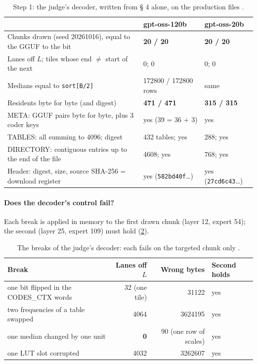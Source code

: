 \begin{table}[ht]
\centering\small
\caption[Step 1: a third decoder from § 4 alone]{Step 1: the judge's decoder, written from § 4 alone, on the production files \mes.}
\label{t2e-tab:geste1}
\begin{tabularx}{\linewidth}{@{}>{\raggedright\arraybackslash}Xll@{}}
\toprule
& gpt-oss-120b & gpt-oss-20b \\
\midrule
Chunks drawn (seed 20261016), equal to the GGUF to the bit & \textbf{20 / 20} & \textbf{20 / 20} \\
Lanes off $L$; tiles whose end $\ne$ start of the next & 0; 0 & 0; 0 \\
Medians equal to \texttt{sort[B/2]} & \num{172800} / \num{172800} rows & same \\
Residents byte for byte (and digest) & \textbf{471 / 471} & \textbf{315 / 315} \\
META: GGUF pairs byte for byte, plus 3 coder keys & yes (39 = 36 + 3) & yes \\
TABLES: all summing to \num{4096}; digest & 432 tables; yes & 288; yes \\
DIRECTORY: contiguous entries up to the end of the file & \num{4608}; yes & 768; yes \\
Header: digest, size, source SHA-256 = download register & yes (\texttt{582bd40f}…) & yes (\texttt{27cd6c43}…) \\
\bottomrule
\end{tabularx}
\end{table}

\paragraph{Does the decoder's control fail?} Each break is applied in memory to the first drawn chunk (layer 12, expert 54); the second (layer 25, expert 109) must hold (\cref{t2e-tab:cassures-dec}).

\begin{table}[ht]
\centering\footnotesize
\caption[The breaks of the judge's decoder]{The breaks of the judge's decoder: each fails on the targeted chunk only \mes.}
\label{t2e-tab:cassures-dec}
\begin{tabular}{@{}lrrl@{}}
\toprule
Break & Lanes off $L$ & Wrong bytes & Second holds \\
\midrule
one bit flipped in the CODES\_CTX words & 32 (one tile) & \num{31122} & yes \\
two frequencies of a table swapped & \num{4064} & \num{3624195} & yes \\
one median changed by one unit & \textbf{0} & 90 (one row of scales) & yes \\
one LUT slot corrupted & \num{4032} & \num{3262607} & yes \\
\bottomrule
\end{tabular}
\end{table}

